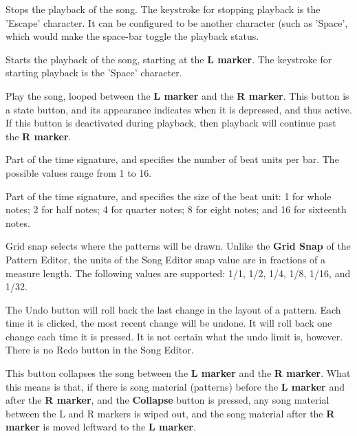    \setcounter{ItemCounter}{0}      %

   Stops the playback of the song.
   The keystroke for stopping playback is the 'Escape' character.
   It can be configured to be another character (such as 'Space', which
   would make the space-bar toggle the playback status.

   Starts the playback of the song, starting at the \textbf{L marker}.
   The keystroke for starting playback is the 'Space' character.

   Play the song, looped between the \textbf{L marker} and the
   \textbf{R marker}.
   This button is a state button, and its appearance indicates when it is
   depressed, and thus active.
   If this button is deactivated during playback, then playback will
   continue past the \textbf{R marker}.

   Part of the time signature, and specifies the number of beat units per bar.
   The possible values range from 1 to 16.

   Part of the time signature, and specifies the size of the beat unit:
   1 for whole notes; 2 for half notes; 4 for quarter notes; 8 for eight notes;
   and 16 for sixteenth notes.

   Grid snap selects where the patterns will be drawn.
   Unlike the \textbf{Grid Snap} of the Pattern Editor, the units
   of the Song Editor snap value are in fractions of a measure length.
   The following values are supported:
   1/1, 1/2, 1/4, 1/8, 1/16, and 1/32.

   The Undo button will roll back the last change in the layout of a
   pattern.  Each time it is clicked, the most recent change will be undone.
   It will roll back one change each time it is pressed.
   It is not certain what the undo limit is, however.
   There is no Redo button in the Song Editor.

   This button collapses the song between the \textbf{L marker} and the
   \textbf{R marker}.
   What this means is that, if there is song material (patterns) before the
   \textbf{L marker} and after the \textbf{R marker},
   and the \textbf{Collapse} button is
   pressed, any song material between the L and R markers is wiped out, and
   the song material after the \textbf{R marker} is moved leftward to
   the \textbf{L marker}.

